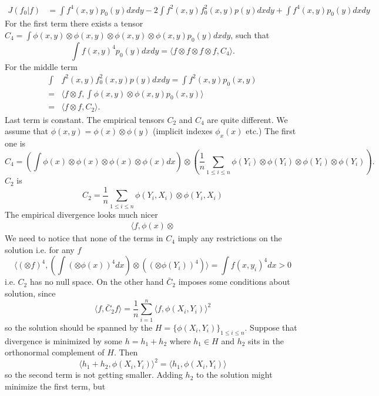 \documentclass[10pt]{article}
\begin{document}
\begin{align}
 J(f_0|f) &= \int f^4(x,y) p_0(y) dx dy - 2 \int f^2(x,y) f_0^2(x,y) p(y) dx dy + \int f^4(x,y) p_0(y) dx dy 
\end{align}
For the first term there exists a tensor $C_4 = \int \phi(x,y) \otimes \phi(x,y) \otimes \phi(x,y) \otimes \phi(x,y) p_0(y) dx dy$, such that 
\begin{equation}
 \int f(x,y)^4 p_0(y) dx dy = \langle f \otimes f \otimes f \otimes f , C_4 \rangle.
\end{equation}
For the middle term 
\begin{align}
\int &f^2(x,y) f_0^2(x,y) p(y) dx dy = \int f^2(x,y) p_0(x,y) \\
 =&  \langle f \otimes f  , \int \phi(x,y) \otimes \phi(x,y) p_0(x,y) \rangle \\
 =& \langle f \otimes f  , C_2 \rangle.
\end{align}
Last term is constant. The empirical tensors $C_2$ and $C_4$ are quite different. We assume that $\phi(x,y) = \phi(x) \otimes \phi(y)$ (implicit indexes $ \phi_x(x)$ etc.) The first one is 
\begin{equation}
 C_4 = \left( \int \phi(x) \otimes \phi(x) \otimes \phi(x) \otimes \phi(x) dx  \right)  \otimes \left( \frac 1 n\sum_{1 \leq i \leq n}  \phi(Y_{i}) \otimes \phi(Y_{i}) \otimes \phi(Y_{i}) \otimes \phi(Y_{i}) \right). 
\end{equation}
$C_2$ is
\begin{equation}
 C_2 = \frac 1 n \sum_{1 \leq i \leq n } \phi(Y_{i},X_{i}) \otimes \phi(Y_{i},X_{i}) 
\end{equation}
The empirical divergence looks much nicer
\begin{align}
 \langle f, \phi(x) \otimes
\end{align}
We need to notice that none of the terms in $C_4$ imply any restrictions on the solution i.e. for any $f$  
\begin{equation}
 \langle  (\otimes f)^4  ,  \left( \int  (\otimes \phi(x))^4 dx  \right)  \otimes \left(    (\otimes \phi(Y_{i}))^4 \right) \rangle = \int f(x,y_i)^4 dx > 0
\end{equation}
i.e. $C_2$ has no null space. On the other hand $\bar C_2$ imposes some conditions about solution, since 
\begin{equation}
 \langle f, \bar C_2 f \rangle = \frac 1 n \sum_{i=1}^n \langle f , \phi(X_i,Y_i) \rangle^2   
\end{equation}
so the solution should be spanned by the $H = \{ \phi(X_i,Y_i) \}_{1 \leq i \leq n}$. Suppose that divergence is minimized by some $h = h_1 + h_2$ where $h_1 \in H$ and $h_2$ sits in the orthonormal complement of $H$. Then 
\begin{equation}
 \langle h_1 + h_2 , \phi(X_i,Y_i) \rangle^2 =\langle h_1 , \phi(X_i,Y_i) \rangle
\end{equation}
so the second term is not getting smaller. Adding $h_2$ to the solution might minimize the first term, but 
\end{document}
